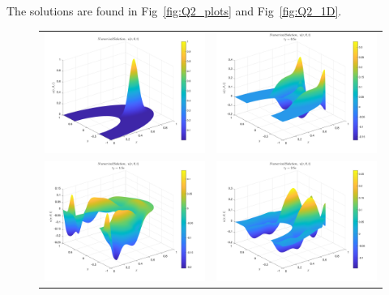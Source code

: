 \documentclass[11pt]{article}
\begin{document}
\begin{enumerate}
\begin{enumerate}
      The solutions are found in Fig~\ref{fig:Q2_plots} and Fig~\ref{fig:Q2_1D}.
      \begin{figure}[htp]
      \centering
      \begin{tabular}{cc}
      \includegraphics[width=3.5in]{Q2_t1.png} & \includegraphics[width=3.5in]{Q2_t2.png} \\
      \includegraphics[width=3.5in]{Q2_t3.png} & \includegraphics[width=3.5in]{Q2_t4.png}

\end{tabular}
\end{figure}
\end{enumerate}
\end{enumerate}
\end{document}
